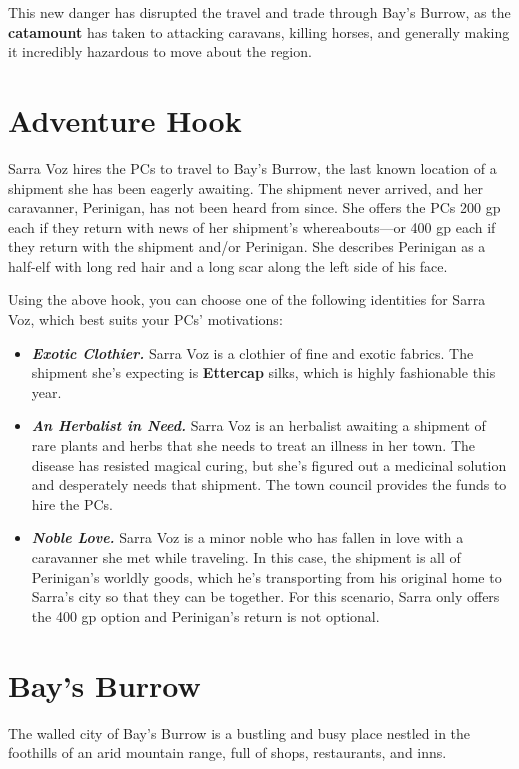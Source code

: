 \documentclass[10pt,a4paper,twoside,bg=print,twocolumn,openany,nodeprecatedcode]{dndbook}
\begin{document}
This new danger has disrupted the travel and trade through Bay's Burrow, as the \textbf{catamount} has taken to attacking caravans, killing horses, and generally making it incredibly hazardous to move about the region.

\section{Adventure Hook}
Sarra Voz hires the PCs to travel to Bay's Burrow, the last known location of a shipment she has been eagerly awaiting. The shipment never arrived, and her caravanner, Perinigan, has not been heard from since. She offers the PCs 200 gp each if they return with news of her shipment's whereabouts—or 400 gp each if they return with the shipment and/or Perinigan. She describes Perinigan as a half-elf with long red hair and a long scar along the left side of his face.

Using the above hook, you can choose one of the following identities for Sarra Voz, which best suits your PCs' motivations:


\begin{itemize}
\item \textbf{\textit{Exotic Clothier.}} Sarra Voz is a clothier of fine and exotic fabrics. The shipment she's expecting is \textbf{Ettercap} silks, which is highly fashionable this year.
\item \textbf{\textit{An Herbalist in Need.}} Sarra Voz is an herbalist awaiting a shipment of rare plants and herbs that she needs to treat an illness in her town. The disease has resisted magical curing, but she's figured out a medicinal solution and desperately needs that shipment. The town council provides the funds to hire the PCs.
\item \textbf{\textit{Noble Love.}} Sarra Voz is a minor noble who has fallen in love with a caravanner she met while traveling. In this case, the shipment is all of Perinigan's worldly goods, which he's transporting from his original home to Sarra's city so that they can be together. For this scenario, Sarra only offers the 400 gp option and Perinigan's return is not optional.
\end{itemize}

\section{Bay's Burrow}
The walled city of Bay's Burrow is a bustling and busy place nestled in the foothills of an arid mountain range, full of shops, restaurants, and inns.
\end{document}
